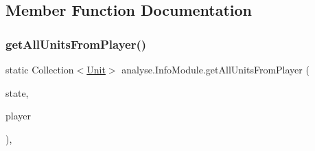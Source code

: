 \subsection{Member Function Documentation}
\mbox{\label{classanalyse_1_1_info_module_a502795470587e7a7b93af1f1fd7a470d}} 
\subsubsection{\texorpdfstring{get\+All\+Units\+From\+Player()}{getAllUnitsFromPlayer()}}
{\footnotesize\ttfamily static Collection$<$\mbox{\hyperlink{classgame_1_1board_1_1_unit}{Unit}}$>$ analyse.\+Info\+Module.\+get\+All\+Units\+From\+Player (\begin{DoxyParamCaption}\item[{\mbox{\hyperlink{classgame_1_1game_state_1_1_game_state}{Game\+State}}}]{state,  }\item[{\mbox{\hyperlink{enumgame_1_1_e_player}{E\+Player}}}]{player }\end{DoxyParamCaption})\hspace{0.3cm}{\ttfamily [inline]}, {\ttfamily [static]}}

